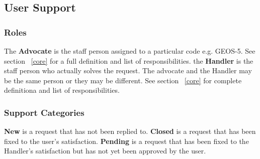 \subsection{User Support}
\label{sec:usr_support}


\subsubsection{Roles}
The {\bf Advocate} is the staff person assigned to a particular code e.g. GEOS-5. See section ~\ref{core} for a full definition and list of responsibilities. 
the {\bf Handler} is the staff person who actually solves the request. The advocate and the Handler may be the same person or they may be different. See section ~\ref{core} for complete definitiona and list of responsibilities.

\subsubsection{Support Categories}
{\bf New} is a request that has not been replied to.
{\bf Closed} is a request that has been fixed to the user's satisfaction.
{\bf Pending} is a request that has been fixed to the Handler's satisfaction but has not yet been approved by the user.


